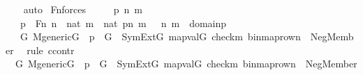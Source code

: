 \begin{isabellebody}
\ \ \isamarkupfalse%
\ auto%
\endisatagproof
{\isafoldproof}%
%
\isadelimproof
\isanewline
%
\endisadelimproof
\isanewline
{}\isamarkupfalse%
\ Fn{\isacharunderscore}{\kern0pt}{}{\isacharunderscore}{\kern0pt}forces\ {\isacharcolon}{\kern0pt}\ \isanewline
\ \ \ p\ n\ m\ \isanewline
\ \ \ {\isachardoublequoteopen}p\ {\isasymin}\ Fn{\isachardoublequoteclose}\ {\isachardoublequoteopen}n\ {\isasymin}\ nat{\isachardoublequoteclose}\ {\isachardoublequoteopen}m\ {\isasymin}\ nat{\isachardoublequoteclose}\ {\isachardoublequoteopen}p{\isacharbackquote}{\kern0pt}{\isacharless}{\kern0pt}n{\isacharcomma}{\kern0pt}\ m{\isachargreater}{\kern0pt}\ {\isacharequal}{\kern0pt}\ {}{\isachardoublequoteclose}\ {\isachardoublequoteopen}{\isacharless}{\kern0pt}n\ {\isacharcomma}{\kern0pt}m{\isachargreater}{\kern0pt}\ {\isasymin}\ domain{\isacharparenleft}{\kern0pt}p{\isacharparenright}{\kern0pt}{\isachardoublequoteclose}\ \ \isanewline
\ \ \ {\isachardoublequoteopen}{\isasymforall}G{\isachardot}{\kern0pt}\ M{\isacharunderscore}{\kern0pt}generic{\isacharparenleft}{\kern0pt}G{\isacharparenright}{\kern0pt}\ {\isasymand}\ p\ {\isasymin}\ G\ {\isasymlongrightarrow}\ SymExt{\isacharparenleft}{\kern0pt}G{\isacharparenright}{\kern0pt}{\isacharcomma}{\kern0pt}\ map{\isacharparenleft}{\kern0pt}val{\isacharparenleft}{\kern0pt}G{\isacharparenright}{\kern0pt}{\isacharcomma}{\kern0pt}\ {\isacharbrackleft}{\kern0pt}check{\isacharparenleft}{\kern0pt}m{\isacharparenright}{\kern0pt}{\isacharcomma}{\kern0pt}\ binmap{\isacharunderscore}{\kern0pt}row{\isacharprime}{\kern0pt}{\isacharparenleft}{\kern0pt}n{\isacharparenright}{\kern0pt}{\isacharbrackright}{\kern0pt}{\isacharparenright}{\kern0pt}\ {\isasymTurnstile}\ Neg{\isacharparenleft}{\kern0pt}Member{\isacharparenleft}{\kern0pt}{}{\isacharcomma}{\kern0pt}\ {}{\isacharparenright}{\kern0pt}{\isacharparenright}{\kern0pt}{\isachardoublequoteclose}\ \isanewline
%
\isadelimproof
%
\endisadelimproof
%
\isatagproof
{}\isamarkupfalse%
{\isacharparenleft}{\kern0pt}rule\ ccontr{\isacharparenright}{\kern0pt}\isanewline
\ \ \isamarkupfalse%
\ {\isachardoublequoteopen}{\isasymnot}\ {\isacharparenleft}{\kern0pt}{\isasymforall}G{\isachardot}{\kern0pt}\ M{\isacharunderscore}{\kern0pt}generic{\isacharparenleft}{\kern0pt}G{\isacharparenright}{\kern0pt}\ {\isasymand}\ p\ {\isasymin}\ G\ {\isasymlongrightarrow}\ SymExt{\isacharparenleft}{\kern0pt}G{\isacharparenright}{\kern0pt}{\isacharcomma}{\kern0pt}\ map{\isacharparenleft}{\kern0pt}val{\isacharparenleft}{\kern0pt}G{\isacharparenright}{\kern0pt}{\isacharcomma}{\kern0pt}\ {\isacharbrackleft}{\kern0pt}check{\isacharparenleft}{\kern0pt}m{\isacharparenright}{\kern0pt}{\isacharcomma}{\kern0pt}\ binmap{\isacharunderscore}{\kern0pt}row{\isacharprime}{\kern0pt}{\isacharparenleft}{\kern0pt}n{\isacharparenright}{\kern0pt}{\isacharbrackright}{\kern0pt}{\isacharparenright}{\kern0pt}\ {\isasymTurnstile}\ Neg{\isacharparenleft}{\kern0pt}Member{\isacharparenleft}{\kern0pt}{}{\isacharcomma}{\kern0pt}\ {}{\isacharparenright}{\kern0pt}{\isacharparenright}{\kern0pt}{\isacharparenright}{\kern0pt}{\isachardoublequoteclose}\ \isanewline

\end{isabellebody}
